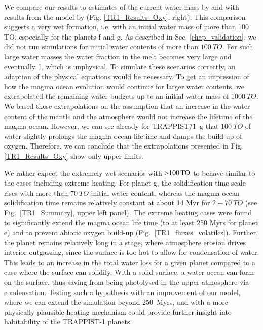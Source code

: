 \documentclass[oneside,twocolumn]{article}
\begin{document}
We compare our results to estimates of the current water mass by \citet{Dorn2018} and with results from the model by \citet{Noack2016} (Fig. \ref{TR1_Results_Oxy}, right).
This comparison suggests a very wet formation, i.e. with an initial water mass of more than 100 TO, especially for the planets f and g. 
As described in Sec. \ref{chap_validation}, we did not run simulations for initial water contents of more than $\SI{100}{TO}$.
For such large water masses the water fraction in the melt becomes very large and eventually 1, which is unphysical. 
To simulate these scenarios correctly, an adaption of the physical equations would be necessary. 
To get an impression of how the magma ocean evolution would continue for larger water contents, we extrapolated the remaining water budgets up to an initial water mass of $\SI{1000}{TO}$.
We based these extrapolations on the assumption that an increase in the water content of the mantle and the atmosphere would not increase the lifetime of the magma ocean.
However, we can see already for TRAPPIST\=/1~g that $\SI{100}{TO}$ of water slightly prolongs the magma ocean lifetime and damps the build-up of oxygen.
Therefore, we can conclude that the extrapolations presented in Fig. \ref{TR1_Results_Oxy} show only upper limits.

We rather expect the extremely wet scenarios with $\SI{>100}{TO}$ to behave similar to the cases including extreme heating. For planet g, the solidification time scale rises with more than $\SI{70}{TO}$ initial water content, whereas the magma ocean solidification time remains relatively constant at about 14 Myr for $2-\SI{70}{TO}$ (see Fig.~\ref{TR1_Summary}, upper left panel). 
The extreme heating cases were found to significantly extend the magma ocean life time (to at least 250 Myrs for planet e) and to prevent abiotic oxygen build-up (Fig.~\ref{TR1_fluxes_volatiles}). Further, the planet remains relatively long in a stage, where atmosphere erosion drives interior outgassing, since the surface is too hot to allow for condensation of water. This leads to an increase in the total water loss for a given planet compared to a case where the surface can solidify. With a solid surface, a water ocean can form on the surface, thus saving  from being photolysed in the upper atmosphere via condensation. Testing such a hypothesis with an improvement of  our model, where we can extend the simulation beyond 250~Myrs, and with a more physically plausible heating mechanism could provide further insight into habitability of the TRAPPIST-1 planets.
\end{document}
